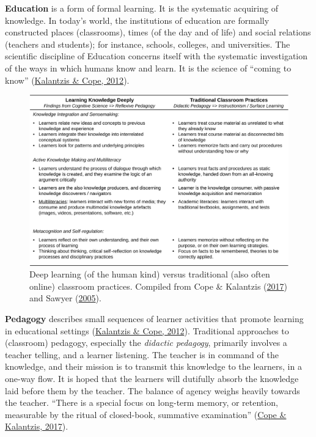 \documentclass[letterpaper, nobind]{templates/ociamthesis}
\begin{document}
\textbf{Education} is a form of formal learning. It is the systematic
acquiring of knowledge. In today's world, the institutions of education
are formally constructed places (classrooms), times (of the day and of
life) and social relations (teachers and students); for instance,
schools, colleges, and universities. The scientific discipline of
Education concerns itself with the systematic investigation of the ways
in which humans know and learn. It is the science of ``coming to know''
(\protect\hyperlink{ref-kalantzis2012newa}{Kalantzis \& Cope, 2012}).

\begin{figure}

{\centering \includegraphics[width=1\linewidth]{figs/deep-learning-surface-learning} 

}

\caption[Learning knowledge deeply vs.~traditional classroom practices.]{Deep learning (of the human kind) versus traditional (also often online) classroom practices. Compiled from Cope \& Kalantzis (\protect\hyperlink{ref-cope2017elearningc}{2017}) and Sawyer (\protect\hyperlink{ref-sawyer2005cambridge}{2005}).}\label{fig:deep-learning-surface-learning}
\end{figure}





\textbf{Pedagogy} describes small sequences of learner activities that
promote learning in educational settings (\protect\hyperlink{ref-kalantzis2012newa}{Kalantzis \& Cope, 2012}).
Traditional approaches to (classroom) pedagogy, especially the \emph{didactic
pedagogy}, primarily involves a teacher telling, and a learner
listening. The teacher is in command of the knowledge, and their mission
is to transmit this knowledge to the learners, in a one-way flow. It is
hoped that the learners will dutifully absorb the knowledge laid before
them by the teacher. The balance of agency weighs heavily towards the
teacher. ``There is a special focus on long-term memory, or retention,
measurable by the ritual of closed-book, summative examination''
(\protect\hyperlink{ref-cope2017elearningc}{Cope \& Kalantzis, 2017}).
\end{document}
